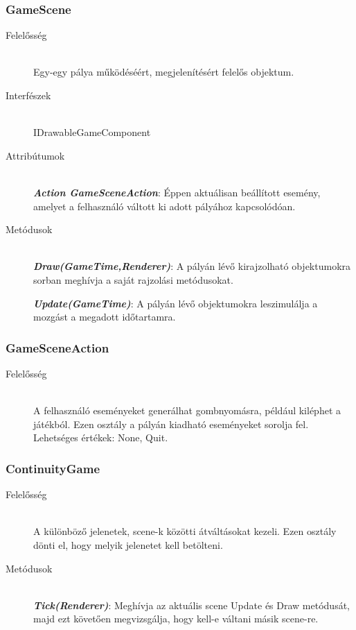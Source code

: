 \subsubsection{GameScene}
	\begin{description}
		\item[Felelősség] \hfill \\
		Egy-egy pálya működéséért, megjelenítésért felelős objektum.
		\item[Interfészek]\hfill \\
		IDrawableGameComponent
		\item[Attribútumok]\hfill \\
		\textbf{\emph{Action GameSceneAction}}: Éppen aktuálisan beállított esemény, amelyet a felhasználó váltott ki adott pályához kapcsolódóan.

		\item[Metódusok]\hfill \\
		\textbf{\emph{Draw(GameTime,Renderer)}}: A pályán lévő kirajzolható objektumokra sorban meghívja a saját rajzolási metódusokat.

		\textbf{\emph{Update(GameTime)}}: A pályán lévő objektumokra leszimulálja a mozgást a megadott időtartamra.
	\end{description}
	
\subsubsection{GameSceneAction}
	\begin{description}
		\item[Felelősség] \hfill \\
		A felhasználó eseményeket generálhat gombnyomásra, például kiléphet a játékból. Ezen osztály a pályán kiadható eseményeket sorolja fel. Lehetséges értékek: None, Quit.
	\end{description}
	
\subsubsection{ContinuityGame}
	\begin{description}
		\item[Felelősség] \hfill \\
		A különböző jelenetek, scene-k közötti átváltásokat kezeli. Ezen osztály dönti el, hogy melyik jelenetet kell betölteni.
		\item[Metódusok]\hfill \\
		\textbf{\emph{Tick(Renderer)}}: Meghívja az aktuális scene Update és Draw metódusát, majd ezt követően megvizsgálja, hogy kell-e váltani másik scene-re.
	\end{description}
	
